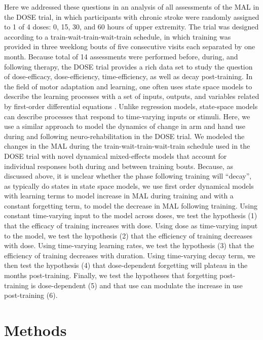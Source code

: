 Here we addressed these questions in an analysis of all assessments of the MAL in the DOSE trial, in which participants with chronic stroke were randomly assigned to 1 of 4 doses: 0, 15, 30, and 60 hours of upper extremity.
The trial was designed according to a train-wait-train-wait-train schedule, in which training was provided in three weeklong bouts of five consecutive visits each separated by one month. 
Because total of 14 assessments were performed before, during, and following therapy, the DOSE trial provides a rich data set to study the question of dose-efficacy, dose-efficiency, time-efficiency, as well as decay post-training. 
In the field of motor adaptation and learning, one often uses state space models to describe the learning processes with a set of inputs, outputs, and variables related by first-order differential equations \cite{Smith2006, Lee2009}. 
Unlike regression models, state-space models can describe processes that respond to time-varying inputs or stimuli. 
Here, we use a similar approach to model the dynamics of change in arm and hand use during and following neuro-rehabilitation in the DOSE trial. 
We modeled the changes in the MAL during the train-wait-train-wait-train schedule used in the DOSE trial with novel dynamical mixed-effects models that account for individual responses both during and between training bouts. 
Because, as discussed above, it is unclear whether the phase following training will “decay”, as typically do states in state space models, we use first order dynamical models with learning terms to model increase in MAL during training and with a constant forgetting term, to model the decrease in MAL following training. 
Using constant time-varying input to the model across doses, we test the hypothesis (1) that the efficacy of training increases with dose. 
Using dose as time-varying input to the model, we test the hypothesis (2) that the efficiency of training decreases with dose. 
Using time-varying learning rates, we test the hypothesis (3) that the efficiency of training decreases with duration. 
Using time-varying decay term, we then test the hypothesis (4) that dose-dependent forgetting will plateau in the months post-training. 
Finally, we test the hypotheses that forgetting post-training is dose-dependent (5) and that use can modulate the increase in use post-training (6). 



\section{Methods}


